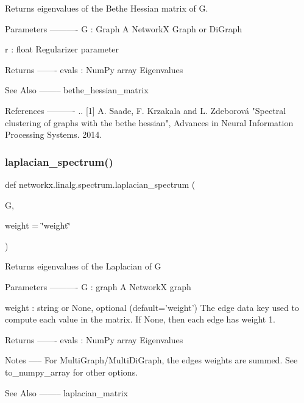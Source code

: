 \begin{DoxyVerb}Returns eigenvalues of the Bethe Hessian matrix of G.

Parameters
----------
G : Graph
   A NetworkX Graph or DiGraph

r : float
   Regularizer parameter

Returns
-------
evals : NumPy array
  Eigenvalues

See Also
--------
bethe_hessian_matrix

References
----------
.. [1] A. Saade, F. Krzakala and L. Zdeborová
   "Spectral clustering of graphs with the bethe hessian",
   Advances in Neural Information Processing Systems. 2014.
\end{DoxyVerb}
 \mbox{\label{namespacenetworkx_1_1linalg_1_1spectrum_a3dcfffa7b1aecf8e735e0b79c38602e2}} 
\subsubsection{\texorpdfstring{laplacian\+\_\+spectrum()}{laplacian\_spectrum()}}
{\footnotesize\ttfamily def networkx.\+linalg.\+spectrum.\+laplacian\+\_\+spectrum (\begin{DoxyParamCaption}\item[{}]{G,  }\item[{}]{weight = {\ttfamily \char`\"{}weight\char`\"{}} }\end{DoxyParamCaption})}

\begin{DoxyVerb}Returns eigenvalues of the Laplacian of G

Parameters
----------
G : graph
   A NetworkX graph

weight : string or None, optional (default='weight')
   The edge data key used to compute each value in the matrix.
   If None, then each edge has weight 1.

Returns
-------
evals : NumPy array
  Eigenvalues

Notes
-----
For MultiGraph/MultiDiGraph, the edges weights are summed.
See to_numpy_array for other options.

See Also
--------
laplacian_matrix
\end{DoxyVerb}
 \mbox{\label{namespacenetworkx_1_1linalg_1_1spectrum_ac85c3062adc5046b637c5f93ab7ab735}} 
